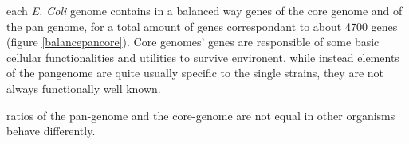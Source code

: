 


each \emph{E. Coli} genome contains in a balanced way genes of the core genome and of the pan genome, for a total amount of genes correspondant to about 4700 genes (figure \ref{balancepancore}). Core genomes' genes are responsible of some basic cellular functionalities and utilities to survive environent, while instead elements of the pangenome are quite usually specific to the single strains, they are not always functionally well known.




ratios of the pan-genome and the core-genome are not equal in other
organisms behave differently.
